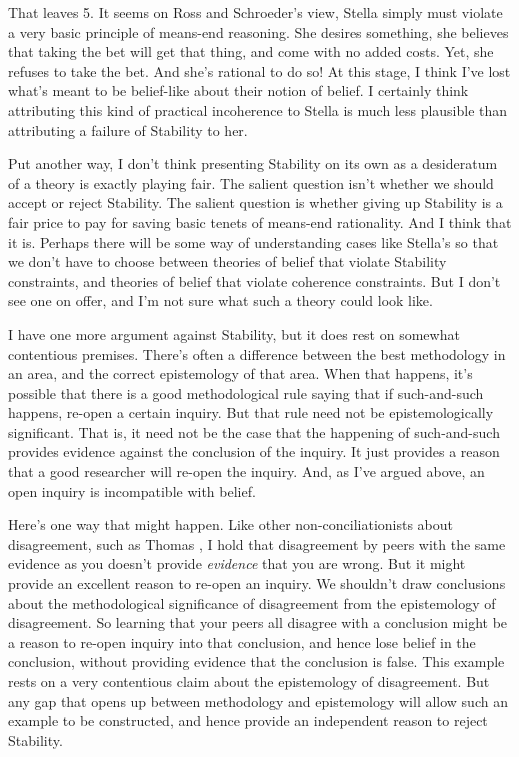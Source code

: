 \documentclass[
  11pt,
]{book}
\begin{document}
That leaves 5. It seems on Ross and Schroeder's view, Stella simply must violate a very basic principle of means-end reasoning. She desires something, she believes that taking the bet will get that thing, and come with no added costs. Yet, she refuses to take the bet. And she's rational to do so! At this stage, I think I've lost what's meant to be belief-like about their notion of belief. I certainly think attributing this kind of practical incoherence to Stella is much less plausible than attributing a failure of Stability to her.

Put another way, I don't think presenting Stability on its own as a desideratum of a theory is exactly playing fair. The salient question isn't whether we should accept or reject Stability. The salient question is whether giving up Stability is a fair price to pay for saving basic tenets of means-end rationality. And I think that it is. Perhaps there will be some way of understanding cases like Stella's so that we don't have to choose between theories of belief that violate Stability constraints, and theories of belief that violate coherence constraints. But I don't see one on offer, and I'm not sure what such a theory could look like.

I have one more argument against Stability, but it does rest on somewhat contentious premises. There's often a difference between the best methodology in an area, and the correct epistemology of that area. When that happens, it's possible that there is a good methodological rule saying that if such-and-such happens, re-open a certain inquiry. But that rule need not be epistemologically significant. That is, it need not be the case that the happening of such-and-such provides evidence against the conclusion of the inquiry. It just provides a reason that a good researcher will re-open the inquiry. And, as I've argued above, an open inquiry is incompatible with belief.

Here's one way that might happen. Like other non-conciliationists about disagreement, such as Thomas \citeyearpar{Kelly2010-KELPDA}, I hold that disagreement by peers with the same evidence as you doesn't provide \emph{evidence} that you are wrong. But it might provide an excellent reason to re-open an inquiry. We shouldn't draw conclusions about the methodological significance of disagreement from the epistemology of disagreement. So learning that your peers all disagree with a conclusion might be a reason to re-open inquiry into that conclusion, and hence lose belief in the conclusion, without providing evidence that the conclusion is false. This example rests on a very contentious claim about the epistemology of disagreement. But any gap that opens up between methodology and epistemology will allow such an example to be constructed, and hence provide an independent reason to reject Stability.
\end{document}
